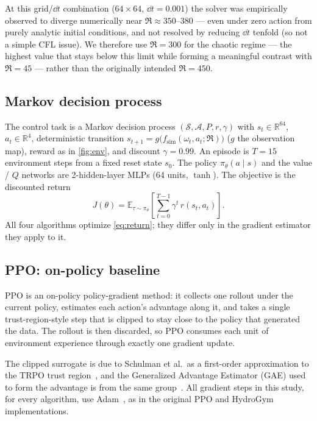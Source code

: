 At this grid/$\dd t$ combination ($64\times 64$, $\dd t=0.001$) the solver was
empirically observed to diverge numerically near $\Re\approx 350$--$380$ ---
even under zero action from purely analytic initial conditions, and not
resolved by reducing $\dd t$ tenfold (so not a simple CFL issue). We
therefore use $\Re=300$ for the chaotic regime --- the highest value that
stays below this limit while forming a meaningful contrast with $\Re=45$ ---
rather than the originally intended $\Re=450$.

\subsection{Markov decision process}
\label{sec:mdp}

The control task is a Markov decision process
$(\mathcal{S},\mathcal{A},P,r,\gamma)$ with
$s_t\in\mathbb{R}^{64}$, $a_t\in\mathbb{R}^{4}$, deterministic transition
$s_{t+1}=g\big(f_{\mathrm{sim}}(\omega_t,a_t;\Re)\big)$ ($g$ the observation
map), reward as in \cref{fig:env}, and discount $\gamma=0.99$. An episode is
$T=15$ environment steps from a fixed reset state $s_0$. The policy
$\pi_\theta(a\mid s)$ and the value / $Q$ networks are 2-hidden-layer MLPs
(64 units, $\tanh$). The objective is the discounted return
\begin{equation}
  J(\theta)=\mathbb{E}_{\tau\sim\pi_\theta}\!\left[\textstyle\sum_{t=0}^{T-1}\gamma^{t}\,r(s_t,a_t)\right].
  \label{eq:return}
\end{equation}
All four algorithms optimize \cref{eq:return}; they differ only in the
gradient estimator they apply to it.

\subsection{PPO: on-policy baseline}
\label{sec:ppo}

PPO is an on-policy policy-gradient method: it collects one rollout under
the current policy, estimates each action's advantage along it, and takes a
single trust-region-style step that is clipped to stay close to the policy
that generated the data. The rollout is then discarded, so PPO consumes
each unit of environment experience through exactly one gradient update.

The clipped surrogate is due to Schulman et al.\ as a first-order
approximation to the TRPO trust region~\cite{ppo2017,trpo2015}, and the
Generalized Advantage Estimator (GAE) used to form the advantage is from the
same group~\cite{gae2015}. All gradient steps in this study, for every
algorithm, use Adam~\cite{kingma2015adam}, as in the original PPO and
HydroGym~\cite{hydrogym2026} implementations.

